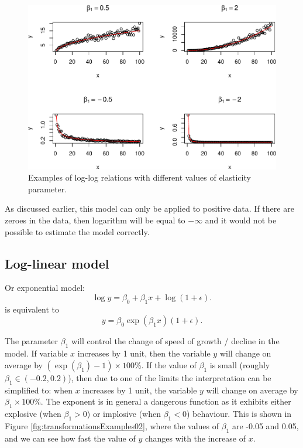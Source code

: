\documentclass[
]{book}
\theoremstyle{definition}
\theoremstyle{definition}
\theoremstyle{definition}
\theoremstyle{definition}
\theoremstyle{remark}
\begin{document}
\begin{figure}
\centering
\includegraphics{Svetunkov---Statistics-for-Business-Analytics_files/figure-latex/transformationsExamples01-1.pdf}
\caption{\label{fig:transformationsExamples01}Examples of log-log relations with different values of elasticity parameter.}
\end{figure}

As discussed earlier, this model can only be applied to positive data. If there are zeroes in the data, then logarithm will be equal to \(-\infty\) and it would not be possible to estimate the model correctly.

\subsection{Log-linear model}\label{log-linear-model}

Or exponential model:
\begin{equation}
    \log y = \beta_0 + \beta_1 x + \log (1+\epsilon) .
    \label{eq:transformLogLinear}
\end{equation}
is equivalent to
\begin{equation}
    y = \beta_0 \exp(\beta_1 x) (1+\epsilon) .
    \label{eq:transformExponential}
\end{equation}

The parameter \(\beta_1\) will control the change of speed of growth / decline in the model. If variable \(x\) increases by 1 unit, then the variable \(y\) will change on average by \((\exp(\beta_1)-1)\times 100\)\%. If the value of \(\beta_1\) is small (roughly \(\beta_1 \in (-0.2, 0.2)\)), then due to one of the limits the interpretation can be simplified to: when \(x\) increases by 1 unit, the variable \(y\) will change on average by \(\beta_1\times 100\)\%. The exponent is in general a dangerous function as it exhibits either explosive (when \(\beta_1 > 0\)) or implosive (when \(\beta_1 < 0\)) behaviour. This is shown in Figure \ref{fig:transformationsExamples02}, where the values of \(\beta_1\) are -0.05 and 0.05, and we can see how fast the value of \(y\) changes with the increase of \(x\).
\end{document}
